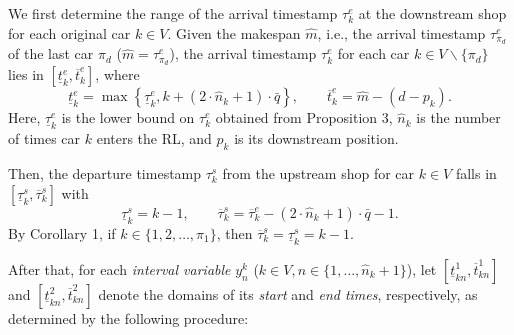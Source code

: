 \documentclass[12pt]{article}
\begin{document}
We first determine the range of the arrival timestamp $\tau^e_k$ at the downstream shop for each original car $k\in V$. Given the makespan $\widehat{m}$, i.e., the arrival timestamp $\tau^e_{\pi_d}$ of the last car $\pi_d$ ($\widehat{m}=\tau^e_{\pi_d}$), the arrival timestamp $\tau^e_k$ for each car $k\in V\backslash\{\pi_d\}$ lies in $\left[\underline{t}^e_k,\overline{t}^e_k\right]$, where
\begin{equation*}
    \underline{t}^e_k = \max \left\{\underline{\tau}^e_{k}, k + (2\cdot\widehat{n}_k + 1)\cdot \bar{q}\right\}, \qquad \overline{t}^e_k=\widehat{m}-(d-p_k).
\end{equation*}
\noindent Here, $\underline{\tau}^e_{k}$ is the lower bound on $\tau^e_k$ obtained from Proposition 3, $\widehat{n}_k$ is the number of times car $k$ enters the RL, and $p_k$ is its downstream position.

Then, the departure timestamp $\tau^s_k$ from the upstream shop for car $k\in V$ falls in $\left[\underline{\tau}^s_k,\overline{\tau}^s_k\right]$ with
\begin{equation*}
    \underline{\tau}^s_k = k - 1, \qquad \overline{\tau}^s_k=\overline{\tau}^e_k-(2\cdot \widehat{n}_k + 1) \cdot \bar{q} - 1.
\end{equation*}
By Corollary 1, if $k\in \{1,2,\dots, \pi_1\}$, then $\overline{\tau}^s_k=\underline{\tau}^s_k=k-1$.

After that, for each \textit{interval variable} $y^k_n$ ($k\in V, n\in \{1,\dots,\widehat{n}_k+1\}$), let $\left[\underline{t}_{kn}^{1},\overline{t}^{1}_{kn}\right]$ and $\left[\underline{t}_{kn}^{2},\overline{t}^{2}_{kn}\right]$ denote the domains of its \textit{start} and \textit{end times}, respectively, as determined by the following procedure:

\end{document}
